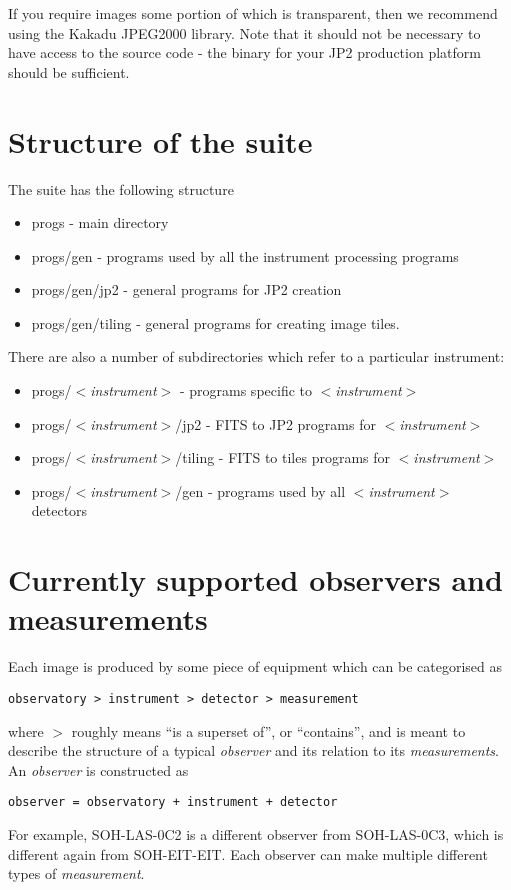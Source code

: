 \documentclass[namedreferences]{SolarPhysics}
\newcommand{\cvar}[1]{$<${\it #1}$>$}
\begin{document}
\begin{article}
If you require images some portion of which is transparent, then we
recommend using the Kakadu JPEG2000 library.  Note that it should not
be necessary to have access to the source code - the binary for your
JP2 production platform should be sufficient.



\section{Structure of the suite}\label{sec:structure}

The suite has the following structure

\begin{itemize}
\item progs - main directory
\item progs/gen - programs used by all the instrument processing programs
\item progs/gen/jp2 - general programs for JP2 creation
\item progs/gen/tiling - general programs for creating image tiles.
\end{itemize}


There are also a number of subdirectories which refer to a particular
instrument:
\begin{itemize}
\item progs/\cvar{instrument} -  programs specific to \cvar{instrument} 
\item progs/\cvar{instrument}/jp2 - FITS to JP2 programs for \cvar{instrument} 
\item progs/\cvar{instrument}/tiling - FITS to tiles programs for \cvar{instrument} 
\item progs/\cvar{instrument}/gen - programs used by all \cvar{instrument}  detectors
\end{itemize}


\section{Currently supported observers and measurements}

Each image is produced by some piece of equipment which can be
categorised as
\begin{verbatim}
observatory > instrument > detector > measurement
\end{verbatim}
where $>$ roughly means ``is a superset of'', or ``contains'', and is
meant to describe the structure of a typical {\it observer} and its
relation to its {\it measurements}.  An {\it observer} is constructed
as
\begin{verbatim}
observer = observatory + instrument + detector
\end{verbatim}
For example, SOH-LAS-0C2 is a different observer from SOH-LAS-0C3,
which is different again from SOH-EIT-EIT.  Each observer can make
multiple different types of {\it measurement}.


\end{article}
\end{document}
